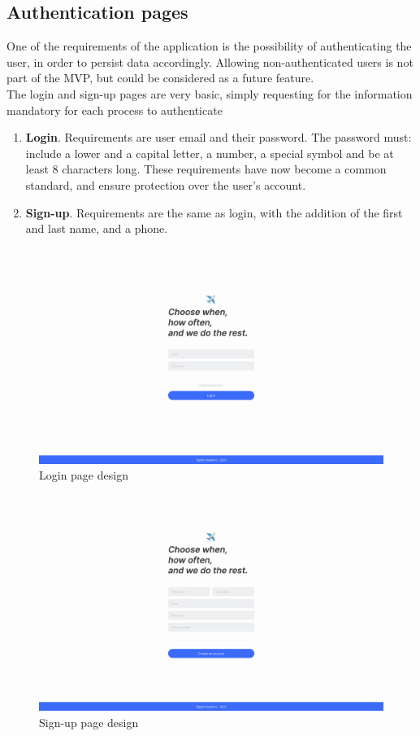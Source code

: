 \documentclass[./memory.tex]{subfiles}
\begin{document}
\subsection{Authentication pages}
One of the requirements of the application is the possibility of authenticating
the user, in order to persist data accordingly. Allowing non-authenticated users
is not part of the MVP, but could be considered as a future feature.
\\[8pt]
The login and sign-up pages are very basic, simply requesting for the
information mandatory for each process to authenticate
\begin{enumerate}[label = -]
	\item\textbf{Login}. Requirements are user email and their password. The
	password must: include a lower and a capital letter, a number, a special
	symbol and be at least 8 characters long. These requirements have now
	become a common standard, and ensure protection over the user's account.
	\item\textbf{Sign-up}. Requirements are the same as login, with the addition
	of the first and last name, and a phone.
\end{enumerate}
\begin{figure}[H]
	\centering
	\includegraphics[width=\textwidth]{./assets/designs/login-desktop.png}
	\caption{Login page design}
\end{figure}
\begin{figure}[H]
	\centering
	\includegraphics[width=\textwidth]{./assets/designs/signup-desktop.png}
	\caption{Sign-up page design}
\end{figure}
\newpage
\end{document}
